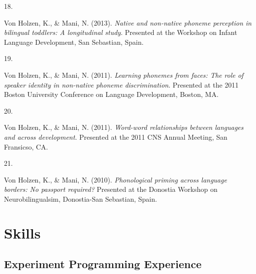 \documentclass[10pt,a4paper,]{article}
\newlength{\cslhangindent}
\newlength{\csllabelwidth}
\newcommand{\CSLLeftMargin}[1]{\parbox[t]{\csllabelwidth}{\hfill #1~}}
\newcommand{\CSLRightInline}[1]{\parbox[t]{\linewidth - \cslhangindent - \csllabelwidth}{#1}\vspace{0.8ex}}
\begin{document}
\leavevmode{}%
\CSLLeftMargin{18. }%
\CSLRightInline{Von Holzen, K., \& Mani, N. (2013). \emph{Native and
non-native phoneme perception in bilingual toddlers: A longitudinal
study}. Presented at the Workshop on Infant Language Development, San
Sebastian, Spain.}

\leavevmode{}%
\CSLLeftMargin{19. }%
\CSLRightInline{Von Holzen, K., \& Mani, N. (2011). \emph{Learning
phonemes from faces: The role of speaker identity in non-native phoneme
discrimination}. Presented at the 2011 Boston University Conference on
Language Development, Boston, MA.}

\leavevmode{}%
\CSLLeftMargin{20. }%
\CSLRightInline{Von Holzen, K., \& Mani, N. (2011). \emph{Word-word
relationships between languages and across development}. Presented at
the 2011 CNS Annual Meeting, San Fransicso, CA.}

\leavevmode{}%
\CSLLeftMargin{21. }%
\CSLRightInline{Von Holzen, K., \& Mani, N. (2010). \emph{Phonological
priming across language borders: No passport required?} Presented at the
Donostia Workshop on Neurobilingualsim, Donostia-San Sebastian, Spain.}

\hypertarget{skills}{%
\section{Skills}\label{skills}}

\hypertarget{experiment-programming-experience}{%
\subsection{Experiment Programming
Experience}\label{experiment-programming-experience}}
\end{document}
